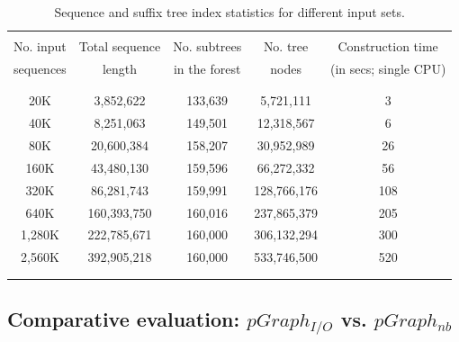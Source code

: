 \documentclass[10pt,journal,letterpaper,compsoc]{IEEEtran}
\def\colrule{\\[-7pt]\hline\\[-6pt]}
\begin{document}
\begin{table}[thb]
\begin{center}
\begin{tabular}{c|c|c|c|c|}
\colrule
No. input  & Total sequence & No. subtrees& No. tree & Construction time  \\
sequences & length & in the forest & nodes & (in secs; single CPU) \\
 \colrule
 20K & 3,852,622 & 133,639 & 5,721,111 & 3\\
 40K & 8,251,063 & 149,501 & 12,318,567 & 6 \\
 80K & 20,600,384 & 158,207 & 30,952,989 & 26\\
 160K & 43,480,130 & 159,596 & 66,272,332 & 56\\
 320K & 86,281,743 & 159,991 & 128,766,176 & 108\\
 640K & 160,393,750 & 160,016 & 237,865,379 & 205\\
 1,280K & 222,785,671 & 160,000 & 306,132,294 & 300\\
 2,560K& 392,905,218 & 160,000 & 533,746,500 & 520\\
\colrule
\end{tabular}
\end{center}
\caption{\label{tabInputTrees}
Sequence and suffix tree index statistics for different input sets.
}
\end{table}

\subsection{Comparative evaluation: $pGraph_{I/O}$ vs. $pGraph_{nb}$}
\label{secComp}
\end{document}
